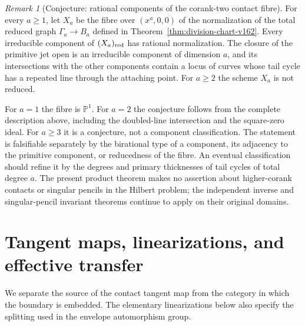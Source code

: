 \documentclass[11pt,reqno]{amsart}
\numberwithin{equation}{section}
\theoremstyle{definition}\newtheorem{definition}[theorem]{Definition}
\theoremstyle{remark}\newtheorem{remark}[theorem]{Remark}
\newcommand{\Pj}{\mathbb P}\newcommand{\A}{\mathbb A}
\begin{document}
\begin{remark}[Conjecture: rational components of the corank-two contact fibre]
\label{conj:contact-components-v163}
For every $a\geq1$, let $X_a$ be the fibre over $(x^a,0,0)$ of the
normalization of the total reduced graph $\Gamma_a\to B_a$ defined
in Theorem~\ref{thm:division-chart-v162}. Every irreducible component
of $(X_a)_{\rm red}$ has rational normalization. The closure of the
primitive jet open is an irreducible component of dimension $a$,
and its intersections with the other components contain a locus of
curves whose tail cycle has a repeated line through the attaching
point. For $a\geq2$ the scheme $X_a$ is not reduced.
\end{remark}
For $a=1$ the fibre is $\Pj^1$. For $a=2$ the conjecture follows
from the complete description above, including the doubled-line
intersection and the square-zero ideal. For $a\geq3$ it is a
conjecture, not a component classification. The statement is
falsifiable separately by the birational type of a component, its
adjacency to the primitive component, or reducedness of the fibre.
An eventual classification should refine it by the degrees and
primary thicknesses of tail cycles of total degree $a$. The present
product theorem makes no assertion about higher-corank contacts or
singular pencils in the Hilbert problem; the independent inverse
and singular-pencil invariant theorems continue to apply on their
original domains.

\section{Tangent maps, linearizations, and effective transfer}
\label{sec:tangent-effective-v163}
We separate the source of the contact tangent map from the category in
which the boundary is embedded. The elementary linearizations below
also specify the splitting used in the envelope automorphism group.
\end{document}
